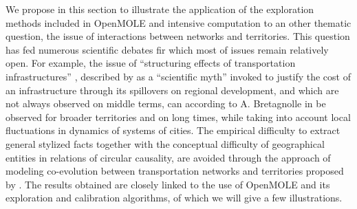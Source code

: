 \documentclass[10pt]{article}
\begin{document}
We propose in this section to illustrate the application of the exploration methods included in OpenMOLE and intensive computation to an other thematic question, the issue of interactions between networks and territories. This question has fed numerous scientific debates fir which most of issues remain relatively open. For example, the issue of ``structuring effects of transportation infrastructures'' \citep{bonnafous1974methodologies}, described by \cite{offner1993effets} as a ``scientific myth'' invoked to justify the cost of an infrastructure through its spillovers on regional development, and which are not always observed on middle terms, can according to A. Bretagnolle in \citep{offner2014effets} be observed for broader territories and on long times, while taking into account local fluctuations in dynamics of systems of cities. The empirical difficulty to extract general stylized facts together with the conceptual difficulty of geographical entities in relations of circular causality, are avoided through the approach of modeling co-evolution between transportation networks and territories proposed by \cite{raimbault2018modelisation}. The results obtained are closely linked to the use of OpenMOLE and its exploration and calibration algorithms, of which we will give a few illustrations.
\end{document}

